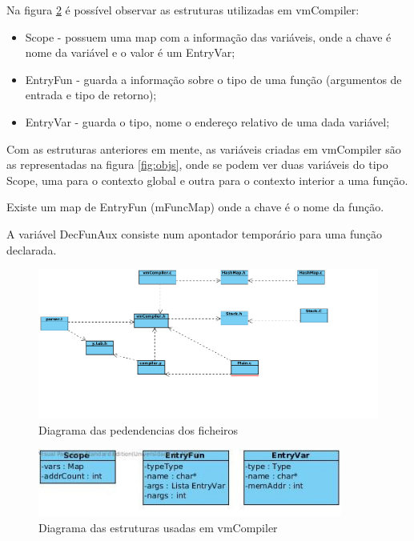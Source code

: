 \documentclass[a4paper,10pt]{report}
\begin{document}
    Na figura \ref{fig:struct} é possível observar as estruturas utilizadas em vmCompiler:
    \begin{itemize}
      \item Scope - possuem uma map com a informação das variáveis, onde a chave é nome da variável e o valor é um EntryVar;
      \item EntryFun - guarda a informação sobre o tipo de uma função (argumentos de entrada e tipo de retorno);
      \item EntryVar - guarda o tipo, nome o endereço relativo de uma dada variável;
    \end{itemize}

    Com as estruturas anteriores em mente, as variáveis criadas em vmCompiler são as representadas na figura \ref{fig:objs}, onde se podem ver duas variáveis do tipo Scope, uma para o contexto global e outra para o contexto interior a uma função.

    Existe um map de EntryFun (mFuncMap) onde a chave é o nome da função.
    
    A variável DecFunAux consiste num apontador temporário para uma função declarada.

\begin{figure}
\centering
\includegraphics[width=15cm]{imagens/dependecias.png}
\caption{Diagrama das pedendencias dos ficheiros}
\label{fig:dependencias}
\end{figure}

\begin{figure}
\centering
\includegraphics[width=10cm]{imagens/estruturas.jpg}
\caption{Diagrama das estruturas usadas em vmCompiler}
\label{fig:struct}
\end{figure}
\end{document}
